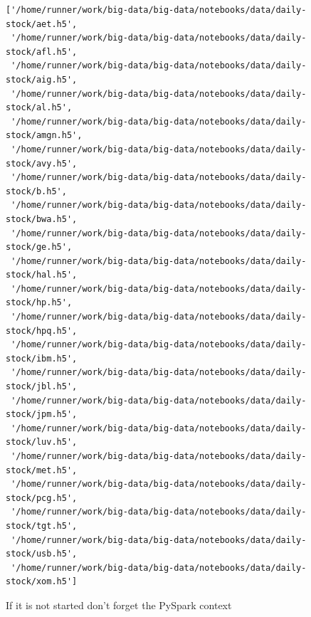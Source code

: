 \documentclass[11pt]{article}
\makeatletter
\newcommand{\boxspacing}{\kern\kvtcb@left@rule\kern\kvtcb@boxsep}
\newcommand{\prompt}[4]{
        \ttfamily\llap{{\color{#2}[#3]:\hspace{3pt}#4}}\vspace{-\baselineskip}
    }
\makeatother
\begin{document}
            \begin{tcolorbox}[breakable, size=fbox, boxrule=.5pt, pad at break*=1mm, opacityfill=0]
\prompt{Out}{outcolor}{38}{\boxspacing}
\begin{Verbatim}[commandchars=\\\{\}]
['/home/runner/work/big-data/big-data/notebooks/data/daily-stock/aet.h5',
 '/home/runner/work/big-data/big-data/notebooks/data/daily-stock/afl.h5',
 '/home/runner/work/big-data/big-data/notebooks/data/daily-stock/aig.h5',
 '/home/runner/work/big-data/big-data/notebooks/data/daily-stock/al.h5',
 '/home/runner/work/big-data/big-data/notebooks/data/daily-stock/amgn.h5',
 '/home/runner/work/big-data/big-data/notebooks/data/daily-stock/avy.h5',
 '/home/runner/work/big-data/big-data/notebooks/data/daily-stock/b.h5',
 '/home/runner/work/big-data/big-data/notebooks/data/daily-stock/bwa.h5',
 '/home/runner/work/big-data/big-data/notebooks/data/daily-stock/ge.h5',
 '/home/runner/work/big-data/big-data/notebooks/data/daily-stock/hal.h5',
 '/home/runner/work/big-data/big-data/notebooks/data/daily-stock/hp.h5',
 '/home/runner/work/big-data/big-data/notebooks/data/daily-stock/hpq.h5',
 '/home/runner/work/big-data/big-data/notebooks/data/daily-stock/ibm.h5',
 '/home/runner/work/big-data/big-data/notebooks/data/daily-stock/jbl.h5',
 '/home/runner/work/big-data/big-data/notebooks/data/daily-stock/jpm.h5',
 '/home/runner/work/big-data/big-data/notebooks/data/daily-stock/luv.h5',
 '/home/runner/work/big-data/big-data/notebooks/data/daily-stock/met.h5',
 '/home/runner/work/big-data/big-data/notebooks/data/daily-stock/pcg.h5',
 '/home/runner/work/big-data/big-data/notebooks/data/daily-stock/tgt.h5',
 '/home/runner/work/big-data/big-data/notebooks/data/daily-stock/usb.h5',
 '/home/runner/work/big-data/big-data/notebooks/data/daily-stock/xom.h5']
\end{Verbatim}
\end{tcolorbox}
        
    If it is not started don't forget the PySpark context
\end{document}
